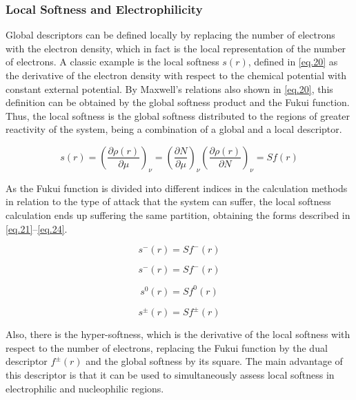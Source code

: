 \documentclass[a4paper,11pt]{refart}
\begin{document}
	\subsubsection{Local Softness and Electrophilicity}

	Global descriptors can be defined locally by replacing the number of electrons with the electron density, which in fact is the local representation of the number of electrons. A classic example is the local softness $s(r)$, defined in \autoref{eq.20} as the derivative of the electron density with respect to the chemical potential with constant external potential. By Maxwell's relations also shown in \autoref{eq.20}, this definition can be obtained by the global softness product and the Fukui function. Thus, the local softness is the global softness distributed to the regions of greater reactivity of the system, being a combination of a global and a local descriptor\cite{Lee1988}.

	\begin{equation}
	s(r)= \left(\frac{\partial \rho(r)}{\partial \mu} \right)_\nu =
	\left(\frac{\partial N}{\partial \mu}\right)_\nu
	\left(\frac{\partial \rho(r)}{\partial N} \right)_\nu = Sf(r)
	\label{eq.20}
	\end{equation}

	As the Fukui function is divided into different indices in the calculation methods in relation to the type of attack that the system can suffer, the local softness calculation ends up suffering the same partition, obtaining the forms described in \autoref{eq.21}--\autoref{eq.24}.

	\begin{equation}
	s^-(r) = Sf^-(r)
	\label{eq.21}
	\end{equation}

	\begin{equation}
	s^-(r) = Sf^-(r)
	\label{eq.22}
	\end{equation}

	\begin{equation}
	s^{0}(r) = Sf^{0}(r)
	\label{eq.23}
	\end{equation}

	\begin{equation}
	s^{\pm}(r) = Sf^{\pm}(r)
	\label{eq.24}
	\end{equation}

	Also, there is the hyper-softness, which is the derivative of the local softness with respect to the number of electrons, replacing the Fukui function by the dual descriptor $f^{\pm}(r)$ and the global softness by its square\cite {sandoval2018theoretical}. The main advantage of this descriptor is that it can be used to simultaneously assess local softness in electrophilic and nucleophilic regions.
\end{document}

